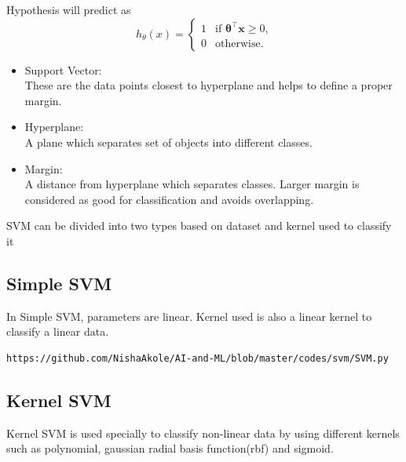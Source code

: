 \documentclass[journal,12pt,twocolumn]{IEEEtran}
\begin{document}

Hypothesis will predict as
\[
    h_{\theta}(x) =
    \begin{cases}
        1 & \text{if $\mathbf{\theta}^\intercal \mathbf{x} \geq0$,}\\
        0 & \text{otherwise.}
    \end{cases}
\]

\begin{itemize}           
\item Support Vector:\\
	These are the data points closest to hyperplane and helps to define a proper margin.\\
\item Hyperplane:\\
	A plane which separates set of objects into different classes.\\
\item Margin:\\
	A distance from hyperplane which separates classes. Larger margin is considered as good for classification and avoids overlapping.
\end{itemize}

SVM can be divided into two types based on dataset and kernel used to classify it

\subsection{Simple SVM}
In Simple SVM, parameters are linear. Kernel used is also a linear kernel to classify a linear data.

\begin{lstlisting}
https://github.com/NishaAkole/AI-and-ML/blob/master/codes/svm/SVM.py
\end{lstlisting}

\subsection{Kernel SVM}
Kernel SVM is used specially to classify non-linear data by using different kernels such as polynomial, gaussian radial basis function(rbf) and sigmoid.
\end{document}
